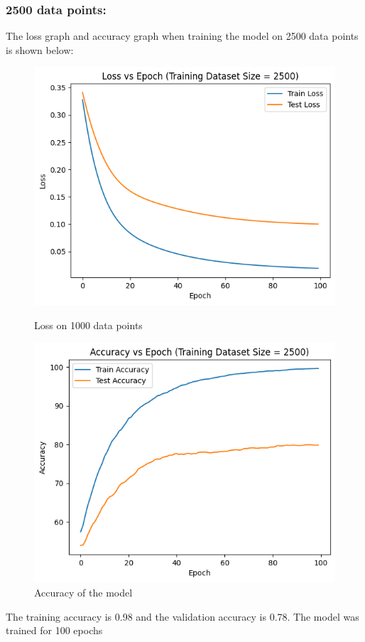 \documentclass{article}
\begin{document}
\subsubsection*{2500 data points:}
The loss graph and accuracy graph when training the model on 2500 data points is shown below:
\begin{figure}[h!]
    \centering
    \begin{minipage}{0.45\textwidth}
        \centering
        \includegraphics[width=1\textwidth]{graphs/output2500.png} %
        \caption{Loss on 1000 data points}
    \end{minipage}\hfill
    \begin{minipage}{0.45\textwidth}
        \centering
        \includegraphics[width=1\textwidth]{graphs/acc2500.png} %
        \caption{Accuracy of the model}
    \end{minipage}
\end{figure}
\newline The training accuracy is 0.98 and the validation accuracy is 0.78. The model was trained for 100 epochs
\end{document}
